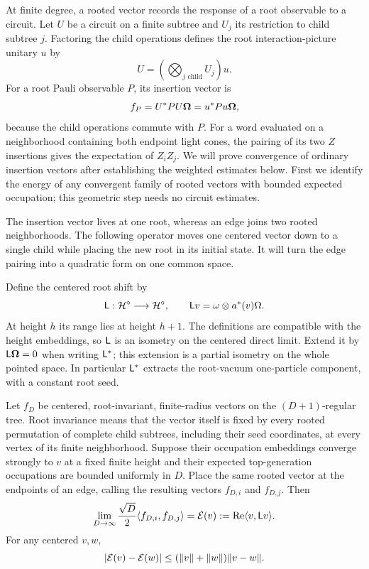 At finite degree, a rooted vector records the response of a root
observable to a circuit. Let $U$ be a circuit on a finite subtree and
$U_j$ its restriction to child subtree $j$. Factoring the child
operations defines the root interaction-picture unitary $u$ by
\[
 U=\left(\bigotimes_{j\text{ child}}U_j\right)u.
\]
For a root Pauli observable $P$, its insertion vector is
\[
 f_P=U^*PU\boldsymbol\Omega=u^*Pu\boldsymbol\Omega,
\]
because the child operations commute with $P$. For a word evaluated
on a neighborhood containing both endpoint light cones, the pairing
of its two $Z$ insertions gives the expectation of $Z_iZ_j$.
We will prove convergence of ordinary insertion vectors
after establishing the weighted estimates below. First we identify
the energy of any convergent family of rooted vectors with bounded
expected occupation; this geometric step needs no circuit estimates.

The insertion vector lives at one root, whereas an edge joins two
rooted neighborhoods.  The following operator moves one centered
vector down to a single child while placing the new root in its
initial state.  It will turn the edge pairing into a quadratic form
on one common space.

Define the centered root shift by
\begin{equation}\label{eq:root-shift}
 \mathsf L:\mathcal H^\circ\longrightarrow\mathcal H^\circ,
 \qquad \mathsf L v=\omega\otimes a^*(v)\Omega.
\end{equation}
At height $h$ its range lies at height $h+1$.  The definitions
are compatible with the height embeddings, so $\mathsf L$ is an
isometry on the centered direct limit.  Extend it by
$\mathsf L\boldsymbol\Omega=0$ when writing $\mathsf L^*$; this extension is a partial
isometry on the whole pointed space.  In particular $\mathsf L^*$
extracts the root-vacuum one-particle component, with a constant
root seed.

\begin{proposition}\label{prop:energy}
Let $f_D$ be centered, root-invariant, finite-radius vectors on
the $(D+1)$-regular tree.  Root invariance means that the vector
itself is fixed by every rooted permutation of complete child
subtrees, including their seed coordinates, at every vertex of
its finite neighborhood.  Suppose their occupation embeddings
converge strongly to $v$ at a fixed finite height and their
expected top-generation occupations are bounded uniformly in
$D$.  Place the same rooted vector at the endpoints of an edge,
calling the resulting vectors $f_{D,i}$ and $f_{D,j}$.  Then
\begin{equation}\label{eq:energy-shift}
 \lim_{D\to\infty}\frac{\sqrt D}{2}
       \langle f_{D,i},f_{D,j}\rangle
       =\mathcal E(v):=\operatorname{Re}\langle v,\mathsf L v\rangle.
\end{equation}
For any centered $v,w$,
\begin{equation}\label{eq:energy-continuity}
 |\mathcal E(v)-\mathcal E(w)|
       \leq(\|v\|+\|w\|)\|v-w\|.
\end{equation}
\end{proposition}

